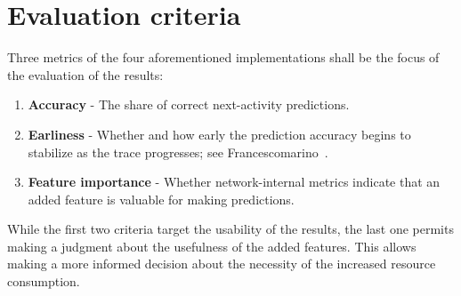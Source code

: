 \section{Evaluation criteria}
Three metrics of the four aforementioned implementations shall be the focus of the evaluation of the results:

\begin{enumerate}
    \item\textbf{Accuracy} - The share of correct next-activity predictions.
    \item\textbf{Earliness} - Whether and how early the prediction accuracy begins to stabilize as the trace progresses; see Francescomarino~\cite{francescomarino2015}.
    \item\textbf{Feature importance} - Whether network-internal metrics indicate that an added feature is valuable for making predictions.
\end{enumerate}

While the first two criteria target the usability of the results, the last one permits making a judgment about the usefulness of the added features. This allows making a more informed decision about the necessity of the increased resource consumption.